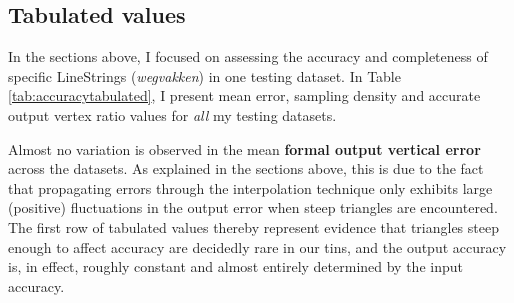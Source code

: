 \subsection{Tabulated values}
\label{sub:accuracytabulated}

In the sections above, I focused on assessing the accuracy and completeness of specific LineStrings (\textit{wegvakken}) in one testing dataset. In Table \ref{tab:accuracytabulated}, I present mean error, sampling density and accurate output vertex ratio values for \textit{all} my testing datasets.

\begin{table}[h]
    \caption[Tabulated 3D-NWB accuracy and completeness results per testing dataset]{Tabulated 3D-NWB accuracy and completeness results per testing dataset. Results based on original and densified NWB vertices.}
    \label{tab:accuracytabulated}
\end{table}

Almost no variation is observed in the mean \textbf{formal output vertical error} across the datasets. As explained in the sections above, this is due to the fact that propagating errors through the interpolation technique only exhibits large (positive) fluctuations in the output error when steep triangles are encountered. The first row of tabulated values thereby represent evidence that triangles steep enough to affect accuracy are decidedly rare in our \ac{tin}s, and the output accuracy is, in effect, roughly constant and almost entirely determined by the input accuracy.

